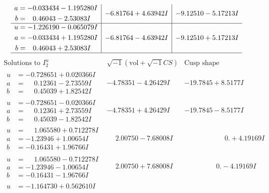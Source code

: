 \documentclass[1p]{elsarticle_modified}
\theoremstyle{definition}
\newcommand{\I}{\sqrt{-1}}
\begin{document}
$$\begin{array}{c|c|c}
\begin{aligned}
a &= -0.033434 - 1.195280 I \\
b &= \phantom{-}0.46043 - 2.53083 I\end{aligned}
 & -6.81764 + 4.63942 I & -9.12510 - 5.17213 I \\ \hline\begin{aligned}
u &= -1.226190 - 0.065079 I \\
a &= -0.033434 + 1.195280 I \\
b &= \phantom{-}0.46043 + 2.53083 I\end{aligned}
 & -6.81764 - 4.63942 I & -9.12510 + 5.17213 I\\
 \hline 
 \end{array}$$\newpage$$\begin{array}{c|c|c}  
\text{Solutions to }I^u_{2}& \I (\text{vol} + \sqrt{-1}CS) & \text{Cusp shape}\\
 \hline 
\begin{aligned}
u &= -0.728651 + 0.020366 I \\
a &= \phantom{-}0.12361 - 2.73559 I \\
b &= \phantom{-}0.45039 + 1.82542 I\end{aligned}
 & -4.78351 - 4.26429 I & -19.7845 + 8.5177 I \\ \hline\begin{aligned}
u &= -0.728651 - 0.020366 I \\
a &= \phantom{-}0.12361 + 2.73559 I \\
b &= \phantom{-}0.45039 - 1.82542 I\end{aligned}
 & -4.78351 + 4.26429 I & -19.7845 - 8.5177 I \\ \hline\begin{aligned}
u &= \phantom{-}1.065580 + 0.712278 I \\
a &= -1.23946 + 1.00654 I \\
b &= -0.16431 + 1.96766 I\end{aligned}
 & \phantom{-}2.00750 - 7.68008 I & \phantom{-0.000000 -}0. + 4.19169 I \\ \hline\begin{aligned}
u &= \phantom{-}1.065580 - 0.712278 I \\
a &= -1.23946 - 1.00654 I \\
b &= -0.16431 - 1.96766 I\end{aligned}
 & \phantom{-}2.00750 + 7.68008 I & \phantom{-0.000000 } 0. - 4.19169 I \\ \hline\begin{aligned}
u &= -1.164730 + 0.562610 I \\

\end{aligned}
\end{array}$$
\end{document}
